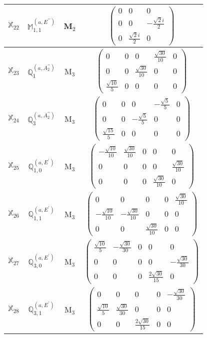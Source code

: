 \documentclass[fleqn,10pt,landscape]{article}
\begin{document}
\begin{itemize}
\begin{center}
\begin{longtable}{c|c|c|c}
$ \mathbb{X}_{22} $ & $\mathbb{M}_{1,1}^{(a,E^{\prime\prime})}$ & M$_{2}$ & $\begin{pmatrix} 0 & 0 & 0 \\ 0 & 0 & - \frac{\sqrt{2} i}{2} \\ 0 & \frac{\sqrt{2} i}{2} & 0 \end{pmatrix}$ \\ \hline
$ \mathbb{X}_{23} $ & $\mathbb{Q}_{1}^{(a,A_{2}^{\prime\prime})}$ & M$_{3}$ & $\begin{pmatrix} 0 & 0 & 0 & \frac{\sqrt{30}}{10} & 0 \\ 0 & 0 & \frac{\sqrt{30}}{10} & 0 & 0 \\ \frac{\sqrt{10}}{5} & 0 & 0 & 0 & 0 \end{pmatrix}$ \\
$ \mathbb{X}_{24} $ & $\mathbb{Q}_{3}^{(a,A_{2}^{\prime\prime})}$ & M$_{3}$ & $\begin{pmatrix} 0 & 0 & 0 & - \frac{\sqrt{5}}{5} & 0 \\ 0 & 0 & - \frac{\sqrt{5}}{5} & 0 & 0 \\ \frac{\sqrt{15}}{5} & 0 & 0 & 0 & 0 \end{pmatrix}$ \\
$ \mathbb{X}_{25} $ & $\mathbb{Q}_{1,0}^{(a,E^{\prime})}$ & M$_{3}$ & $\begin{pmatrix} - \frac{\sqrt{10}}{10} & \frac{\sqrt{30}}{10} & 0 & 0 & 0 \\ 0 & 0 & 0 & 0 & \frac{\sqrt{30}}{10} \\ 0 & 0 & 0 & \frac{\sqrt{30}}{10} & 0 \end{pmatrix}$ \\
$ \mathbb{X}_{26} $ & $\mathbb{Q}_{1,1}^{(a,E^{\prime})}$ & M$_{3}$ & $\begin{pmatrix} 0 & 0 & 0 & 0 & \frac{\sqrt{30}}{10} \\ - \frac{\sqrt{10}}{10} & - \frac{\sqrt{30}}{10} & 0 & 0 & 0 \\ 0 & 0 & \frac{\sqrt{30}}{10} & 0 & 0 \end{pmatrix}$ \\
$ \mathbb{X}_{27} $ & $\mathbb{Q}_{3,0}^{(a,E^{\prime})}$ & M$_{3}$ & $\begin{pmatrix} \frac{\sqrt{10}}{5} & - \frac{\sqrt{30}}{30} & 0 & 0 & 0 \\ 0 & 0 & 0 & 0 & - \frac{\sqrt{30}}{30} \\ 0 & 0 & 0 & \frac{2 \sqrt{30}}{15} & 0 \end{pmatrix}$ \\
$ \mathbb{X}_{28} $ & $\mathbb{Q}_{3,1}^{(a,E^{\prime})}$ & M$_{3}$ & $\begin{pmatrix} 0 & 0 & 0 & 0 & - \frac{\sqrt{30}}{30} \\ \frac{\sqrt{10}}{5} & \frac{\sqrt{30}}{30} & 0 & 0 & 0 \\ 0 & 0 & \frac{2 \sqrt{30}}{15} & 0 & 0 \end{pmatrix}$ \\

\end{longtable}
\end{center}
\end{itemize}
\end{document}
